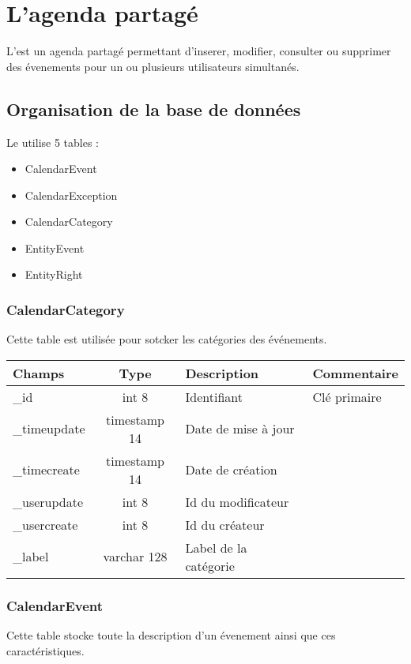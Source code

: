 
\clearpage
\section{L'agenda partagé}

L'\agenda \obm  est un agenda partagé permettant d'inserer, modifier, 
consulter ou supprimer des évenements pour un ou plusieurs utilisateurs 
simultanés.

\subsection{Organisation de la base de données}

Le \calendar utilise 5 tables :
\begin{itemize}
 \item CalendarEvent
 \item CalendarException
 \item CalendarCategory
 \item EntityEvent
 \item EntityRight
\end{itemize}

\subsubsection{CalendarCategory}
Cette table est utilisée pour sotcker les catégories des événements.\\

\begin{tabular}{|p{3cm}|c|p{5.4cm}|p{2.6cm}|}
\hline
\textbf{Champs} & \textbf{Type} & \textbf{Description} & \textbf{Commentaire} \\
\hline
\_id & int 8 & Identifiant & Clé primaire \\
\hline
\_timeupdate & timestamp 14 & Date de mise à jour & \\
\hline
\_timecreate & timestamp 14 & Date de création & \\
\hline
\_userupdate & int 8 & Id du modificateur & \\
\hline
\_usercreate & int 8 & Id du créateur & \\
\hline
\_label & varchar 128 &  Label de la catégorie & \\
\hline
\end{tabular}

\subsubsection{CalendarEvent}
Cette table stocke toute la description d'un évenement ainsi que ces caractéristiques.\\

